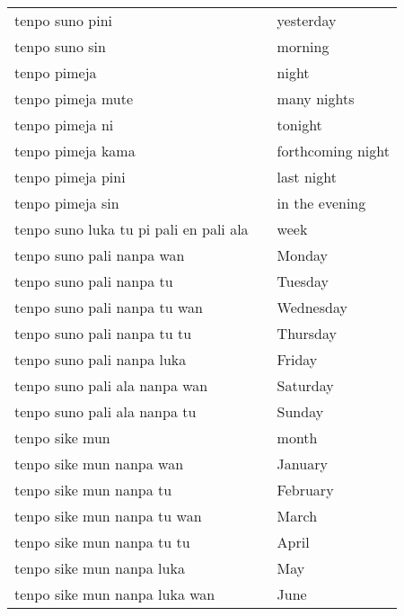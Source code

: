 \begin{supertabular}{p{5,5cm}|ll}
    tenpo suno pini                        &  & yesterday                 \\
    tenpo suno sin                         &  & morning                   \\
    tenpo pimeja                           &  & night                     \\
    tenpo pimeja mute                      &  & many nights               \\
    tenpo pimeja ni                        &  & tonight                   \\
    tenpo pimeja kama                      &  & forthcoming night         \\
    tenpo pimeja pini                      &  & last night                \\
    tenpo pimeja sin                       &  & in the evening            \\
    tenpo suno luka tu pi pali en pali ala &  & week                      \\
    tenpo suno pali nanpa wan              &  & Monday                    \\
    tenpo suno pali nanpa tu               &  & Tuesday                   \\
    tenpo suno pali nanpa tu wan           &  & Wednesday                 \\
    tenpo suno pali nanpa tu tu            &  & Thursday                  \\
    tenpo suno pali nanpa luka             &  & Friday                    \\
    tenpo suno pali ala nanpa wan          &  & Saturday                  \\
    tenpo suno pali ala nanpa tu           &  & Sunday                    \\
    tenpo sike mun                         &  & month                     \\
    tenpo sike mun nanpa wan               &  & January                   \\
    tenpo sike mun nanpa tu                &  & February                  \\
    tenpo sike mun nanpa tu wan            &  & March                     \\
    tenpo sike mun nanpa tu tu             &  & April                     \\
    tenpo sike mun nanpa luka              &  & May                       \\
    tenpo sike mun nanpa luka wan          &  & June                      \\

\end{supertabular}
